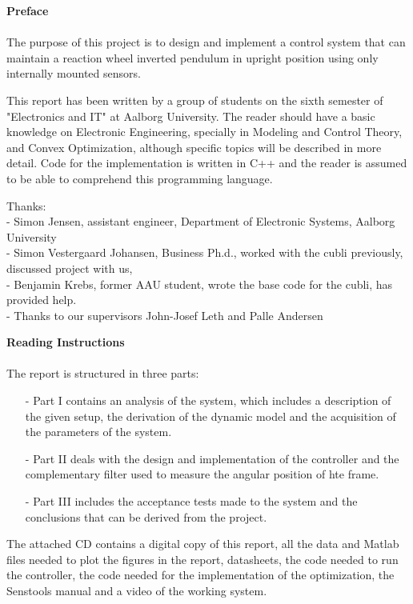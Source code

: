 \textbf{\huge{Preface}}
\\
\\
The purpose of this project is to design and implement a control system that can maintain a reaction wheel inverted pendulum in upright position using only internally mounted sensors.

This report has been written by a group of students on the sixth semester of "Electronics and IT" at Aalborg University.
The reader should have a basic knowledge on Electronic Engineering, specially in Modeling and Control Theory, and Convex Optimization, although specific topics will be described in more detail. Code for the implementation is written in C++ and the reader is assumed to be able to comprehend this programming language. 

Thanks:\\
- Simon Jensen, assistant engineer, Department of Electronic Systems, Aalborg University \\
- Simon Vestergaard Johansen, Business Ph.d., worked with the cubli previously, discussed project with us,\\
- Benjamin Krebs, former AAU student, wrote the base code for the cubli, has provided help.\\
- Thanks to our supervisors John-Josef Leth and Palle Andersen

\textbf{Reading Instructions}
\\
\\
The report is structured in three parts:
\begin{itemize}
\item[-] Part I contains an analysis of the system, which includes a description of the given setup, the derivation of the dynamic model and the acquisition of the parameters of the system.
\item[-] Part II deals with the design and implementation of the controller and the complementary filter used to measure the angular position of hte frame.
\item[-] Part III includes the acceptance tests made to the system and the conclusions that can be derived from the project.
\end{itemize}

The attached CD contains a digital copy of this report, all the data and Matlab files needed to plot the figures in the report, datasheets, the code needed to run the controller, the code needed for the implementation of the optimization, the Senstools manual and a video of the working system.  

